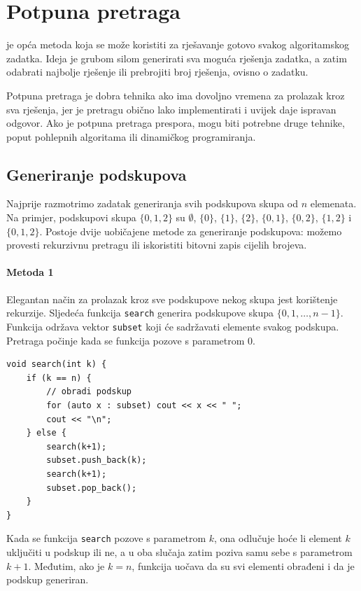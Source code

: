 \chapter{Potpuna pretraga}

je opća metoda koja se može koristiti
za rješavanje gotovo svakog algoritamskog zadatka.
Ideja je grubom silom generirati sva moguća
rješenja zadatka,
a zatim odabrati najbolje rješenje ili prebrojiti
broj rješenja, ovisno o zadatku.

Potpuna pretraga je dobra tehnika
ako ima dovoljno vremena za prolazak kroz sva rješenja,
jer je pretragu obično lako implementirati
i uvijek daje ispravan odgovor.
Ako je potpuna pretraga prespora,
mogu biti potrebne druge tehnike, poput pohlepnih algoritama ili
dinamičkog programiranja.

\section{Generiranje podskupova}


Najprije razmotrimo zadatak generiranja
svih podskupova skupa od $n$ elemenata.
Na primjer, podskupovi skupa $\{0,1,2\}$ su
$\emptyset$, $\{0\}$, $\{1\}$, $\{2\}$, $\{0,1\}$,
$\{0,2\}$, $\{1,2\}$ i $\{0,1,2\}$.
Postoje dvije uobičajene metode za generiranje podskupova:
možemo provesti rekurzivnu pretragu
ili iskoristiti bitovni zapis cijelih brojeva.

\subsubsection{Metoda 1}

Elegantan način za prolazak kroz sve podskupove
nekog skupa jest korištenje rekurzije.
Sljedeća funkcija \texttt{search}
generira podskupove skupa
$\{0,1,\ldots,n-1\}$.
Funkcija održava vektor \texttt{subset}
koji će sadržavati elemente svakog podskupa.
Pretraga počinje kada se funkcija pozove
s parametrom 0.

\begin{lstlisting}
void search(int k) {
    if (k == n) {
        // obradi podskup
        for (auto x : subset) cout << x << " ";
        cout << "\n";
    } else {
        search(k+1);
        subset.push_back(k);
        search(k+1);
        subset.pop_back();
    }
}
\end{lstlisting}

Kada se funkcija \texttt{search}
pozove s parametrom $k$,
ona odlučuje hoće li
element $k$ uključiti u podskup ili ne,
a u oba slučaja
zatim poziva samu sebe s parametrom $k+1$.
Međutim, ako je $k=n$, funkcija uočava da su
svi elementi obrađeni
i da je podskup generiran.

